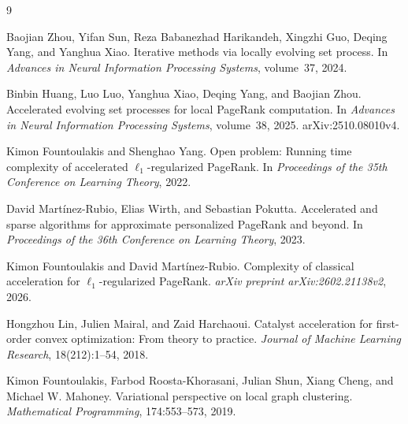 \begin{thebibliography}{9}

Baojian Zhou, Yifan Sun, Reza Babanezhad Harikandeh, Xingzhi Guo, Deqing
Yang, and Yanghua Xiao.
\newblock Iterative methods via locally evolving set process.
\newblock In \emph{Advances in Neural Information Processing Systems},
  volume~37, 2024.

Binbin Huang, Luo Luo, Yanghua Xiao, Deqing Yang, and Baojian Zhou.
\newblock Accelerated evolving set processes for local {PageRank}
  computation.
\newblock In \emph{Advances in Neural Information Processing Systems},
  volume~38, 2025.
\newblock arXiv:2510.08010v4.

Kimon Fountoulakis and Shenghao Yang.
\newblock Open problem: Running time complexity of accelerated
  $\ell_1$-regularized {PageRank}.
\newblock In \emph{Proceedings of the 35th Conference on Learning Theory},
  2022.

David Mart{\'i}nez-Rubio, Elias Wirth, and Sebastian Pokutta.
\newblock Accelerated and sparse algorithms for approximate personalized
  {PageRank} and beyond.
\newblock In \emph{Proceedings of the 36th Conference on Learning Theory},
  2023.

Kimon Fountoulakis and David Mart{\'i}nez-Rubio.
\newblock Complexity of classical acceleration for
  $\ell_1$-regularized {PageRank}.
\newblock \emph{arXiv preprint arXiv:2602.21138v2}, 2026.

Hongzhou Lin, Julien Mairal, and Zaid Harchaoui.
\newblock Catalyst acceleration for first-order convex optimization: From
  theory to practice.
\newblock \emph{Journal of Machine Learning Research}, 18(212):1--54, 2018.

Kimon Fountoulakis, Farbod Roosta-Khorasani, Julian Shun, Xiang Cheng, and
Michael W. Mahoney.
\newblock Variational perspective on local graph clustering.
\newblock \emph{Mathematical Programming}, 174:553--573, 2019.

\end{thebibliography}
